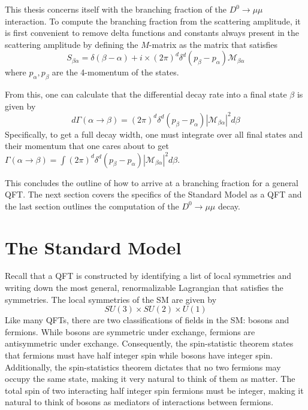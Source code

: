 This thesis concerns itself with the branching fraction of the $D^0 \to \mu \mu$ interaction. To compute the branching fraction from the scattering amplitude, it is first convenient to remove delta functions and constants always present in the scattering amplitude by defining the $M$-matrix as the matrix that satisfies
\begin{equation}
S_{\beta \alpha} = \delta(\beta -\alpha) + i \times(2\pi)^d \delta^d(p_{\beta}-p_{\alpha}) \mathcal{M}_{\beta \alpha}
\end{equation}
where $p_{\alpha}, p_{\beta}$ are the 4-momentum of the states. 

From this, one can calculate that the differential decay rate into a final state $\beta$ is given by
\begin{equation}
d \Gamma(\alpha \to \beta) = (2\pi)^d \delta^d(p_{\beta}-p_{\alpha}) |\mathcal{M}_{\beta \alpha}|^2 d \beta
\end{equation}
Specifically, to get a full decay width, one must integrate over all final states and their momentum that one cares about to get $\Gamma(\alpha \to \beta) = \int (2\pi)^d \delta^d(p_{\beta}-p_{\alpha}) |\mathcal{M}_{\beta \alpha}|^2 d \beta$. 

This concludes the outline of how to arrive at a branching fraction for a general QFT. The next section covers the specifics of the Standard Model as a QFT and the last section outlines the computation of the $D^0 \to \mu \mu$ decay. 

\section{The Standard Model}

Recall that a QFT is constructed by identifying a list of local symmetries and writing down the most general, renormalizable Lagrangian that satisfies the symmetries. The local symmetries of the SM are given by
\begin{equation}
SU(3) \times SU(2) \times U(1)
\end{equation}
Like many QFTs, there are two classifications of fields in the SM: bosons and fermions. While bosons are symmetric under exchange, fermions are antisymmetric under exchange. Consequently, the spin-statistic theorem states that fermions must have half integer spin while bosons have integer spin. Additionally, the spin-statistics theorem dictates that no two fermions may occupy the same state, making it very natural to think of them as matter. The total spin of two interacting half integer spin fermions must be integer, making it natural to think of bosons as mediators of interactions between fermions. 


